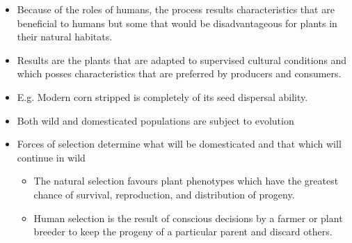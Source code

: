 \documentclass[
  ignorenonframetext,
  aspectratio=169]{beamer}
\providecommand{\tightlist}{%
  \setlength{\itemsep}{0pt}\setlength{\parskip}{0pt}}
\begin{document}
\begin{frame}{}
\protect\hypertarget{section-1}{}
\begin{itemize}
\tightlist
\item
  Because of the roles of humans, the process results characteristics
  that are beneficial to humans but some that would be disadvantageous
  for plants in their natural habitats.
\item
  Results are the plants that are adapted to supervised cultural
  conditions and which posses characteristics that are preferred by
  producers and consumers.
\item
  E.g. Modern corn stripped is completely of its seed dispersal ability.
\item
  Both wild and domesticated populations are subject to evolution
\item
  Forces of selection determine what will be domesticated and that which
  will continue in wild

  \begin{itemize}
  \tightlist
  \item
    The natural selection favours plant phenotypes which have the
    greatest chance of survival, reproduction, and distribution of
    progeny.
  \item
    Human selection is the result of conscious decisions by a farmer or
    plant breeder to keep the progeny of a particular parent and discard
    others.
  \end{itemize}
\end{itemize}
\end{frame}
\end{document}
